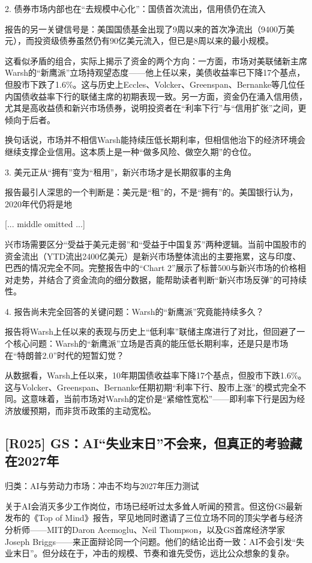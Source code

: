 \documentclass[11pt]{ctexart}
\begin{document}
2. 债券市场内部也在“去规模中心化”：国债首次流出，信用债仍在流入

报告的另一关键信号是：美国国债基金出现了9周以来的首次净流出（9400万美元），而投资级债券虽然仍有90亿美元流入，但已是8周以来的最小规模。

这看似矛盾的组合，实际上揭示了资金的两个方向：一方面，市场对美联储新主席Warsh的“新鹰派”立场持观望态度——他上任以来，美债收益率已下降17个基点，但股市下跌了1.6\%。这与历史上Eccles、Volcker、Greenspan、Bernanke等几位任内国债收益率下行的联储主席的初期表现一致。另一方面，资金仍在涌入信用债，尤其是高收益债和新兴市场债券，说明投资者在“利率下行”与“信用扩张”之间，更倾向于后者。

换句话说，市场并不相信Warsh能持续压低长期利率，但相信他治下的经济环境会继续支撑企业信用。这本质上是一种“做多风险、做空久期”的仓位。

3. 美元正从“拥有”变为“租用”，新兴市场才是长期叙事的主角

报告最引人深思的一个判断是：美元是“租”的，不是“拥有”的。美国银行认为，2020年代仍将是地

[... middle omitted ...]

兴市场需要区分“受益于美元走弱”和“受益于中国复苏”两种逻辑。当前中国股市的资金流出（YTD流出2400亿美元）是新兴市场整体流出的主要拖累，这与印度、巴西的情况完全不同。完整报告中的“Chart 2”展示了标普500与新兴市场的价格相对走势，并结合了资金流向的细分数据，能帮助读者判断“新兴市场反弹”的可持续性。

4. 报告尚未完全回答的关键问题：Warsh的“新鹰派”究竟能持续多久？

报告将Warsh上任以来的表现与历史上“低利率”联储主席进行了对比，但回避了一个核心问题：Warsh的“新鹰派”立场是否真的能压低长期利率，还是只是市场在“特朗普2.0”时代的短暂幻觉？

从数据看，Warsh上任以来，10年期国债收益率下降17个基点，但股市下跌1.6\%。这与Volcker、Greenspan、Bernanke任期初期“利率下行、股市上涨”的模式完全不同。这意味着，当前市场对Warsh的定价是“紧缩性宽松”——即利率下行是因为经济放缓预期，而非货币政策的主动宽松。

\subsection{[R025] GS：AI“失业末日”不会来，但真正的考验藏在2027年}
{\small\color{refgray}归类：AI与劳动力市场：冲击不均与2027年压力测试}

关于AI会消灭多少工作岗位，市场已经听过太多耸人听闻的预言。但这份GS最新发布的《Top of Mind》报告，罕见地同时邀请了三位立场不同的顶尖学者与经济分析师——MIT的Daron Acemoglu、Neil Thompson，以及GS首席经济学家Joseph Briggs——来正面辩论同一个问题。他们的结论出奇一致：AI不会引发“失业末日”。但分歧在于，冲击的规模、节奏和谁先受伤，远比公众想象的复杂。
\end{document}
